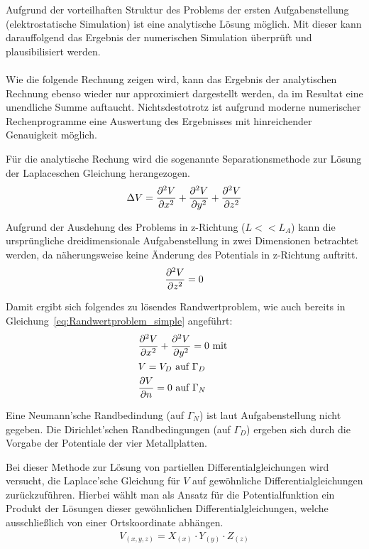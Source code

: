 
Aufgrund der vorteilhaften Struktur des Problems der ersten Aufgabenstellung (elektrostatische Simulation) ist eine analytische Lösung möglich. Mit dieser kann darauffolgend das Ergebnis der numerischen Simulation überprüft und plausibilisiert werden. \\ \\
Wie die folgende Rechnung zeigen wird, kann das Ergebnis der analytischen Rechnung ebenso wieder nur approximiert dargestellt werden, da im Resultat eine unendliche Summe auftaucht. Nichtsdestotrotz ist aufgrund moderne numerischer Rechenprogramme eine Auswertung des Ergebnisses mit hinreichender Genauigkeit möglich. 

Für die analytische Rechung wird die sogenannte Separationsmethode zur Lösung der Laplaceschen Gleichung herangezogen.
\begin{align}
	\label{eq:LaplaceV_ana}
	\Delta V = \frac{\partial^2 V}{\partial x^2} + \frac{\partial^2 V}{\partial y^2} + \frac{\partial^2 V}{\partial z^2}
\end{align}

Aufgrund der Ausdehung des Problems in z-Richtung ($L << L_A$) kann die ursprüngliche dreidimensionale Aufgabenstellung in zwei Dimensionen betrachtet werden, da näherungsweise keine Änderung des Potentials in z-Richtung auftritt. 
\begin{align}
\label{eq:LaplaceVz_ana}
	\frac{\partial^2 V}{\partial z^2} = 0
\end{align}

Damit ergibt sich folgendes zu lösendes Randwertproblem, wie auch bereits in Gleichung~\ref{eq:Randwertproblem_simple} angeführt:
\begin{align}
	\label{eq:Randwertproblem_simple_ana}
	&\frac{\partial^2 V}{\partial x^2} + \frac{\partial^2 V}{\partial y^2} = 0 \text{ mit }\\
	&V = V_D \text{ auf } \Gamma_D \nonumber\\
	&\frac{\partial V}{\partial n} = 0 \text{ auf } \Gamma_N \nonumber
\end{align}

Eine Neumann'sche Randbedindung (auf $\Gamma_N$) ist laut Aufgabenstellung nicht gegeben. Die Dirichlet'schen Randbedingungen (auf $\Gamma_D$) ergeben sich durch die Vorgabe der Potentiale der vier Metallplatten. 

Bei dieser Methode zur Lösung von partiellen Differentialgleichungen wird versucht, die Laplace'sche Gleichung für $V$ auf gewöhnliche Differentialgleichungen zurückzuführen. Hierbei wählt man als Ansatz für die Potentialfunktion ein Produkt der Lösungen dieser gewöhnlichen Differentialgleichungen, welche ausschließlich von einer Ortskoordinate abhängen. 
\begin{align}
	\label{eq:Separationsmethode_3D}
	V_{(x,y,z)} = X_{(x)} \cdot Y_{(y)} \cdot Z_{(z)}
\end{align}

